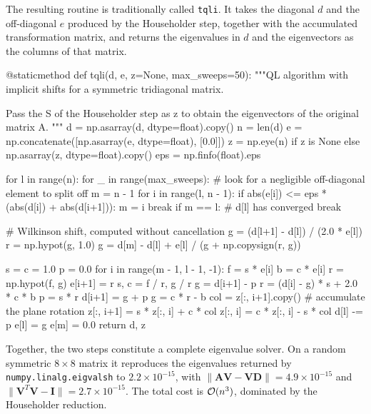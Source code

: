 The resulting routine is traditionally called \texttt{tqli}.  It takes the
diagonal $d$ and the off-diagonal $e$ produced by the Householder step,
together with the accumulated transformation matrix, and returns the
eigenvalues in $d$ and the eigenvectors as the columns of that matrix.

\begin{Python}{}
@staticmethod
def tqli(d, e, z=None, max_sweeps=50):
    """QL algorithm with implicit shifts for a symmetric tridiagonal matrix.

    Pass the S of the Householder step as z to obtain the eigenvectors of
    the original matrix A.
    """
    d = np.asarray(d, dtype=float).copy()
    n = len(d)
    e = np.concatenate([np.asarray(e, dtype=float), [0.0]])
    z = np.eye(n) if z is None else np.asarray(z, dtype=float).copy()
    eps = np.finfo(float).eps

    for l in range(n):
        for _ in range(max_sweeps):
            # look for a negligible off-diagonal element to split off
            m = n - 1
            for i in range(l, n - 1):
                if abs(e[i]) <= eps * (abs(d[i]) + abs(d[i+1])):
                    m = i
                    break
            if m == l:                       # d[l] has converged
                break

            # Wilkinson shift, computed without cancellation
            g = (d[l+1] - d[l]) / (2.0 * e[l])
            r = np.hypot(g, 1.0)
            g = d[m] - d[l] + e[l] / (g + np.copysign(r, g))

            s = c = 1.0
            p = 0.0
            for i in range(m - 1, l - 1, -1):
                f = s * e[i]
                b = c * e[i]
                r = np.hypot(f, g)
                e[i+1] = r
                s, c = f / r, g / r
                g = d[i+1] - p
                r = (d[i] - g) * s + 2.0 * c * b
                p = s * r
                d[i+1] = g + p
                g = c * r - b
                col = z[:, i+1].copy()       # accumulate the plane rotation
                z[:, i+1] = s * z[:, i] + c * col
                z[:, i] = c * z[:, i] - s * col
            d[l] -= p
            e[l] = g
            e[m] = 0.0
    return d, z
\end{Python}

Together, the two steps constitute a complete eigenvalue solver.  On a random
symmetric $8\times8$ matrix it reproduces the eigenvalues returned by
\texttt{numpy.linalg.eigvalsh} to $2.2\times10^{-15}$, with
$\|\bm{A}\bm{V}-\bm{V}\bm{D}\|=4.9\times10^{-15}$ and
$\|\bm{V}^{T}\bm{V}-\bm{I}\|=2.7\times10^{-15}$.  The total cost is
$\mathcal{O}(n^3)$, dominated by the Householder reduction.

